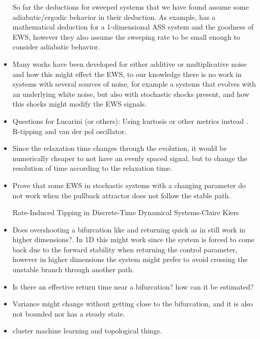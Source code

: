 \begin{itemize}
	So far the deductions for sweeped systems that we have found assume some adiabatic/ergodic behavior in their deduction. As example,  \cite{Romano2018} has a mathematical deduction for a 1-dimensional ASS system and the goodness of EWS, however they also assume the sweeping rate to be small enough to consider adiabatic behavior. 
	
	\item Many works have been developed for either additive or multiplicative noise and how this might effect the EWS, to our knowledge there is no work in systems with several sources of noise, for example a systems that evolves with an underlying white noise, but also with stochastic shocks present, and how this shocks might modify the EWS signals.
	
	\item Questions for Lucarini (or others): Using kurtosis or other metrics instead .  R-tipping and van der pol oscillator.
	
	\item 
	Since the relaxation time changes through the evolution, it would be numerically cheaper to not have an evenly spaced signal, but to change the resolution of time according to the relaxation time.

	\item Prove that some EWS in stochastic systems with a changing parameter do not work  when the pullback attractor does not follow the stable path.   
	
	Rate-Induced Tipping in Discrete-Time Dynamical Systems-Claire Kiers
	

	

	\item Does overshooting a bifurcation like and returning quick as in \cite{Ritchie2021} still work in higher dimensions?. In 1D this might work since the system is forced to come back due to the forward stability when returning the control parameter, however in higher dimensions the system might prefer to avoid crossing the unstable branch through another path.
	
	\item Is there an effective return time near a bifurcation? how can it be estimated?

	
	
	\item Variance might change without getting close to the bifurcation, and it is also not bounded nor has a steady state. 
	
	\item cluster machine learning and topological things. \cite{Gidea2020}
	

\end{itemize}
